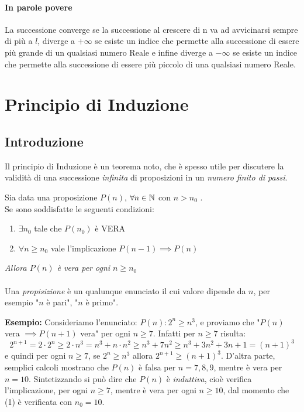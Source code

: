 \documentclass[12pt, a4paper, openany]{book}
\newcommand{\esempio}[1]{\begin{box_esempio} \textbf{Esempio: }#1\end{box_esempio}}
\newcommand{\definizione}[1]{\begin{box_definizione} #1 \end{box_definizione}}
\begin{document}
\paragraph*{In parole povere} La successione converge se la successione al crescere di n va ad avvicinarsi sempre di più a $l$,
diverge a $+\infty$ se esiste un indice che permette alla successione di essere più grande di un qualsiasi numero Reale
e infine diverge a $-\infty$ se esiste un indice che permette alla successione di essere più piccolo di una qualsiasi numero Reale.

\section{Principio di Induzione}
\subsection*{Introduzione}
Il principio di Induzione è un teorema noto, che è spesso utile per discutere la validità di una successione \emph{infinita} di proposizioni in un \emph{numero finito di passi}.

\definizione{
    Sia data una proposizione $P(n)$, $\forall n \in \mathbb{N}$ con $n > n_0$ .
    \\Se sono soddisfatte le seguenti condizioni: 
    \begin{enumerate}
        \item $\exists n_0$ tale che $P(n_0)$ è VERA
        \item $\forall n \geq n_0$ vale l'implicazione $P(n-1) \implies P(n)$
    \end{enumerate}
    \emph{Allora $P(n)$ è vera per ogni $n \geq n_0$}
}
\paragraph*{}
Una \emph{propisizione} è un qualunque enunciato il cui valore dipende da $n$, per esempio "$n$ è pari", "$n$ è primo".

\esempio{
Consideriamo l'enunciato: $P(n): 2^n \geq n^3$,
e proviamo che "$P(n)$ vera $\implies P(n+1)$ vera" per ogni $n\geq 7$.
Infatti per $n \geq 7$ risulta:
\begin{equation*} %
    2^{n+1} = 2\cdot 2^n \geq 2 \cdot n^3 = n^3 + n \cdot n^2 \geq n^3 + 7n^2 \geq n^3 + 3n^2 +3n+1 = (n+1)^3
\end{equation*}
e quindi per ogni $n \geq 7$, se $2^n \geq n^3$ allora $2^{n+1} \geq (n+1)^3$.
D'altra parte, semplici calcoli mostrano che $P(n)$ è falsa per $n = 7,8,9$, mentre è vera per $n=10$.
Sintetizzando si può dire che $P(n)$ è \emph{induttiva}, cioè verifica l'implicazione, per ogni $n \geq 7$, mentre è vera per ogni $n \geq 10$, dal momento che (1) è verificata con $n_0=10$.
}
\end{document}

